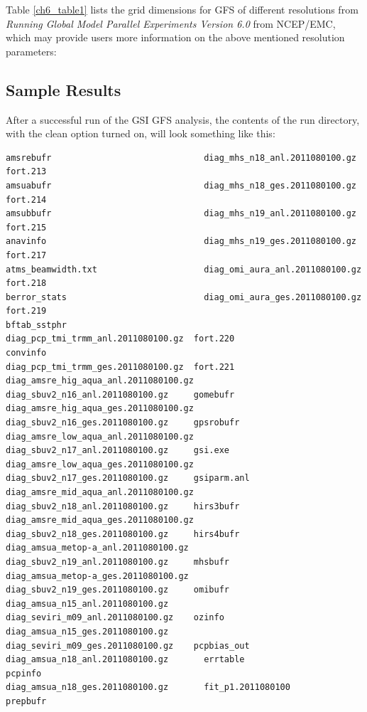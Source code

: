 Table \ref{ch6_table1} lists the grid dimensions for GFS of different resolutions from \textit{Running Global Model Parallel Experiments Version 6.0} from NCEP/EMC, which may provide users more information on the above mentioned resolution parameters:


\subsection{Sample Results}

After a successful run of the GSI GFS analysis, the contents of the run directory, with the clean option turned on, will look something like this:
\begin{scriptsize}
\begin{verbatim}
amsrebufr                              diag_mhs_n18_anl.2011080100.gz       fort.213
amsuabufr                              diag_mhs_n18_ges.2011080100.gz       fort.214
amsubbufr                              diag_mhs_n19_anl.2011080100.gz       fort.215
anavinfo                               diag_mhs_n19_ges.2011080100.gz       fort.217
atms_beamwidth.txt                     diag_omi_aura_anl.2011080100.gz      fort.218
berror_stats                           diag_omi_aura_ges.2011080100.gz      fort.219
bftab_sstphr                           diag_pcp_tmi_trmm_anl.2011080100.gz  fort.220
convinfo                               diag_pcp_tmi_trmm_ges.2011080100.gz  fort.221
diag_amsre_hig_aqua_anl.2011080100.gz  diag_sbuv2_n16_anl.2011080100.gz     gomebufr
diag_amsre_hig_aqua_ges.2011080100.gz  diag_sbuv2_n16_ges.2011080100.gz     gpsrobufr
diag_amsre_low_aqua_anl.2011080100.gz  diag_sbuv2_n17_anl.2011080100.gz     gsi.exe
diag_amsre_low_aqua_ges.2011080100.gz  diag_sbuv2_n17_ges.2011080100.gz     gsiparm.anl
diag_amsre_mid_aqua_anl.2011080100.gz  diag_sbuv2_n18_anl.2011080100.gz     hirs3bufr
diag_amsre_mid_aqua_ges.2011080100.gz  diag_sbuv2_n18_ges.2011080100.gz     hirs4bufr
diag_amsua_metop-a_anl.2011080100.gz   diag_sbuv2_n19_anl.2011080100.gz     mhsbufr
diag_amsua_metop-a_ges.2011080100.gz   diag_sbuv2_n19_ges.2011080100.gz     omibufr
diag_amsua_n15_anl.2011080100.gz       diag_seviri_m09_anl.2011080100.gz    ozinfo
diag_amsua_n15_ges.2011080100.gz       diag_seviri_m09_ges.2011080100.gz    pcpbias_out
diag_amsua_n18_anl.2011080100.gz       errtable                             pcpinfo
diag_amsua_n18_ges.2011080100.gz       fit_p1.2011080100                    prepbufr

\end{verbatim}
\end{scriptsize}
